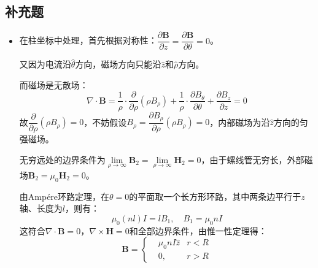 \documentclass[a4paper,fontset=none]{ctexart}
\begin{document}
    \subsection*{补充题}

    \begin{itemize}

    \item[2.]
    在柱坐标中处理，首先根据对称性：$\dfrac{\partial\bm{B}}{\partial z}=\dfrac{\partial\bm{B}}{\partial\theta}=0$。
    
    又因为电流沿$\hat{\theta}$方向，磁场方向只能沿$\hat{z}$和$\hat{\rho}$方向。

    而磁场是无散场：
    \[
    \nabla\cdot\bm{B} = \frac{1}{\rho}\cdot\frac{\partial}{\partial\rho}(\rho B_\rho) + \frac{1}{\rho}\cdot\frac{\partial B_\theta}{\partial\theta} + \frac{\partial B_z}{\partial z} = 0
    \]
    故$\dfrac{\partial}{\partial\rho}(\rho B_\rho)=0$，不妨假设$B_\rho=\dfrac{\partial B_\rho}{\partial\rho}(\rho B_\rho)=0$，内部磁场为沿$\hat{z}$方向的匀强磁场。

    无穷远处的边界条件为$\lim\limits_{\rho\to\infty}\bm{B}_2=\lim\limits_{\rho\to\infty}\bm{H}_2=0$，由于螺线管无穷长，外部磁场$\bm{B}_2=\mu_0\textbf{H}_2=0$。

    由Amp\'{e}re环路定理，在$\theta=0$的平面取一个长方形环路，其中两条边平行于$z$轴、长度为$l$，则有：
    \[
    \mu_0(nl)I = lB_1,\quad B_1 = \mu_0nI
    \]
    这符合$\nabla\cdot\bm{B}=0$，$\nabla\times\bm{H}=0$和全部边界条件，由惟一性定理得：
    \[
    \bm{B} =
    \left\{
        \begin{aligned}
            &\mu_0nI\hat{z} &r<R \\
            &0,\quad &r>R
        \end{aligned}
    \right.
    \]


\end{itemize}
\end{document}
